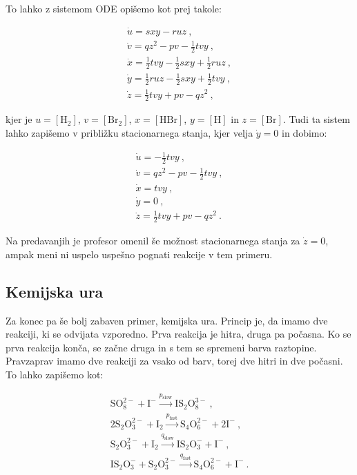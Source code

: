 \documentclass[a4paper]{article}
\begin{document}
To lahko z sistemom ODE opišemo kot prej takole:

\begin{gather}
    \dot{u} = sxy - ruz\>,\\
    \dot{v} = qz^2 - pv - \frac{1}{2}tvy\>,\\
    \dot{x} = \frac{1}{2}tvy - \frac{1}{2}sxy + \frac{1}{2}ruz\>,\\
    \dot{y} = \frac{1}{2}ruz - \frac{1}{2}sxy + \frac{1}{2}tvy\>,\\
    \dot{z} = \frac{1}{2}tvy + pv - qz^2\>,
\end{gather}

kjer je $u = [\mathrm{H}_2]$, $v = [\mathrm{Br}_2]$, $x = [\mathrm{HBr}]$, $y = [\mathrm{H}]$ in $z = [\mathrm{Br}]$.
Tudi ta sistem lahko zapišemo v približku stacionarnega stanja, kjer velja $\dot{y} = 0$ in dobimo:

\begin{gather}
    \dot{u} = -\frac{1}{2}tvy\>,\\
    \dot{v} = qz^2 - pv - \frac{1}{2}tvy\>,\\
    \dot{x} = tvy\>,\\
    \dot{y} = 0\>,\\
    \dot{z} = \frac{1}{2}tvy + pv - qz^2\>.
\end{gather}

Na predavanjih je profesor omenil še možnost stacionarnega stanja za $\dot{z} = 0$, ampak meni ni uspelo
uspešno pognati reakcije v tem primeru.\\

\subsection{Kemijska ura}
Za konec pa še bolj zabaven primer, kemijska ura. Princip je, da imamo dve reakciji, ki se odvijata vzporedno.
Prva reakcija je hitra, druga pa počasna. Ko se prva reakcija konča, se začne druga in s tem se spremeni barva
raztopine. Pravzaprav imamo dve reakciji za vsako od barv, torej dve hitri in dve počasni. To lahko zapišemo kot:

\begin{gather}
    \mathrm{S}\mathrm{O}_8^{2-} + \mathrm{I}^- \overset{p_\mathrm{slow}}{\longrightarrow} \mathrm{I}\mathrm{S}_2\mathrm{O}_8^{3-}\>,\\
    2\mathrm{S}_2\mathrm{O}_3^{2-} + \mathrm{I}_2 \overset{p_\mathrm{fast}}{\longrightarrow} \mathrm{S}_4\mathrm{O}_6^{2-} + 2\mathrm{I}^-\>,\\
    \mathrm{S}_{2}\mathrm{O}_3^{2-} + \mathrm{I_2} \overset{q_\mathrm{slow}}{\longrightarrow} \mathrm{I}\mathrm{S}_2\mathrm{O}_3^{-} + \mathrm{I}^-\>,\\
    \mathrm{I}\mathrm{S}_2\mathrm{O}_3^{-} + \mathrm{S}_2\mathrm{O}_3^{2-} \overset{q_\mathrm{fast}}{\longrightarrow} \mathrm{S}_4\mathrm{O}_6^{2-} + \mathrm{I}^-\>.
\end{gather}
\end{document}
